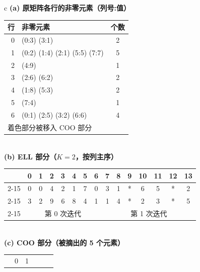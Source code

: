 \begin{figure}[htbp]
  \centering
  \small
  \begin{tabular}{c}
  \textbf{(a) 原矩阵各行的非零元素（列号:值）}\\[0.5em]
  \setlength{\tabcolsep}{5pt}
  \begin{tabular}{r|l|c}
    \hline
    行 & 非零元素 & 个数\\
    \hline
    0 & (0:3) (3:1) & 2\\
    1 & (0:2) (1:4) \colorbox{orange!30}{(2:1)} \colorbox{orange!30}{(5:5)} \colorbox{orange!30}{(7:7)} & 5\\
    2 & (4:9) & 1\\
    3 & (2:6) (6:2) & 2\\
    4 & (1:8) (5:3) & 2\\
    5 & (7:4) & 1\\
    6 & (0:1) (2:5) \colorbox{orange!30}{(3:2)} \colorbox{orange!30}{(6:6)} & 4\\
    \hline
    \multicolumn{3}{l}{\footnotesize 着色部分被移入 COO 部分}\\
  \end{tabular}
  \\[1.2em]
  \textbf{(b) ELL 部分（$K=2$，按列主序）}\\[0.5em]
  \setlength{\tabcolsep}{4pt}
  \begin{tabular}{r|c|c|c|c|c|c|c|c|c|c|c|c|c|c|}
    \multicolumn{1}{c}{} & \multicolumn{1}{c}{0} & \multicolumn{1}{c}{1}
      & \multicolumn{1}{c}{2} & \multicolumn{1}{c}{3} & \multicolumn{1}{c}{4}
      & \multicolumn{1}{c}{5} & \multicolumn{1}{c}{6} & \multicolumn{1}{c}{7}
      & \multicolumn{1}{c}{8} & \multicolumn{1}{c}{9} & \multicolumn{1}{c}{10}
      & \multicolumn{1}{c}{11} & \multicolumn{1}{c}{12} & \multicolumn{1}{c}{13}\\
    \cline{2-15}
    \code{colIdx} & 0 & 0 & 4 & 2 & 1 & 7 & 0 & 3 & 1 & * & 6 & 5 & * & 2\\
    \cline{2-15}
    \code{value}  & 3 & 2 & 9 & 6 & 8 & 4 & 1 & 1 & 4 & * & 2 & 3 & * & 5\\
    \cline{2-15}
    \multicolumn{1}{c}{} & \multicolumn{7}{c}{\footnotesize 第 0 次迭代}
      & \multicolumn{7}{c}{\footnotesize 第 1 次迭代}
  \end{tabular}
  \\[1.2em]
  \textbf{(c) COO 部分（被摘出的 5 个元素）}\\[0.5em]
  \setlength{\tabcolsep}{4pt}
  \begin{tabular}{r|c|c|c|c|c|}
    \multicolumn{1}{c}{} & \multicolumn{1}{c}{0} & \multicolumn{1}{c}{1}

\end{tabular}
\end{tabular}
\end{figure}

